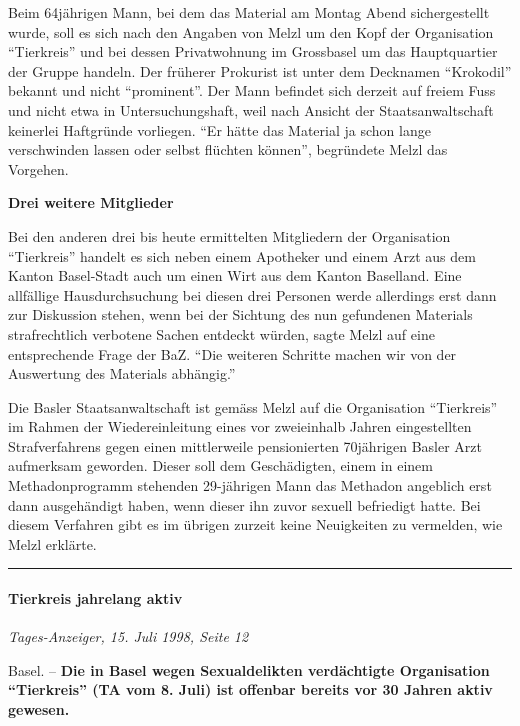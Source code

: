 Beim 64jährigen Mann, bei dem das Material am Montag Abend
sichergestellt wurde, soll es sich nach den Angaben von Melzl um den
Kopf der Organisation ``Tierkreis'' und bei dessen Privatwohnung im
Grossbasel um das Hauptquartier der Gruppe handeln. Der früherer
Prokurist ist unter dem Decknamen ``Krokodil'' bekannt und nicht
``prominent''. Der Mann befindet sich derzeit auf freiem Fuss und nicht
etwa in Unter­suchungs­haft, weil nach Ansicht der Staatsanwaltschaft
keinerlei Haftgründe vorliegen. ``Er hätte das Material ja schon lange
verschwinden lassen oder selbst flüchten können'', begründete Melzl das
Vorgehen.

\textbf{Drei weitere Mitglieder}

Bei den anderen drei bis heute ermittelten Mitgliedern der Organisation
``Tierkreis'' handelt es sich neben einem Apotheker und einem Arzt aus
dem Kanton Basel-Stadt auch um einen Wirt aus dem Kanton Baselland. Eine
allfällige Hausdurchsuchung bei diesen drei Personen werde allerdings
erst dann zur Diskussion stehen, wenn bei der Sichtung des nun
gefundenen Materials strafrechtlich verbotene Sachen entdeckt würden,
sagte Melzl auf eine entsprechende Frage der BaZ. ``Die weiteren
Schritte machen wir von der Auswertung des Materials abhängig.''

Die Basler Staatsanwaltschaft ist gemäss Melzl auf die Organisation
``Tierkreis'' im Rahmen der Wiedereinleitung eines vor zweieinhalb
Jahren eingestellten Strafverfahrens gegen einen mittlerweile
pensionierten 70jährigen Basler Arzt aufmerksam geworden. Dieser soll
dem Geschädigten, einem in einem Methadonprogramm stehenden 29-jährigen
Mann das Methadon angeblich erst dann ausgehändigt haben, wenn dieser
ihn zuvor sexuell befriedigt hatte. Bei diesem Verfahren gibt es im
übrigen zurzeit keine Neuigkeiten zu vermelden, wie Melzl erklärte.

\begin{center}\rule{0.5\linewidth}{\linethickness}\end{center}

\hypertarget{tierkreis-jahrelang-aktiv}{%
\paragraph{Tierkreis jahrelang aktiv}\label{tierkreis-jahrelang-aktiv}}

\emph{Tages-Anzeiger, 15. Juli 1998, Seite 12}

Basel. -- \textbf{Die in Basel wegen Sexualdelikten verdächtigte
Organisation ``Tierkreis'' (TA vom 8. Juli) ist offenbar bereits vor 30
Jahren aktiv gewesen.}

